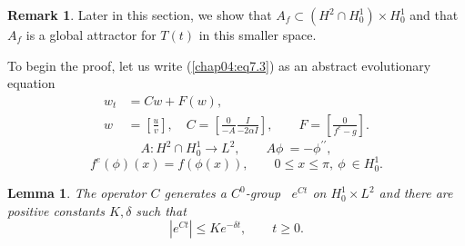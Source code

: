 \documentclass{surv-l}
\theoremstyle{plain}
\newtheorem{lemma}[theorem]{Lemma}
\theoremstyle{definition}
\newtheorem{remark}[theorem]{Remark}
\numberwithin{equation}{section}
\numberwithin{figure}{chapter}
\begin{document}
\begin{remark}\label{rem4.7.2} Later in this section, we show that $A_{f}\subset(H^{2}\cap H_{0}^{1})\times H_{0}^{1}$ and that $A_{f}$ is a global attractor for $T(t)$ in this smaller space.

To begin the proof, let us write (\ref{chap04:eq7.3}) as an abstract evolutionary equation
\begin{equation}\label{chap04:eq7.5}
\begin{split}
w_{t}&=Cw+F(w),\\
w&=\left[{\frac{u}{v}}\right],\quad C=\left[\!{\frac{0}{-A}}
{\frac{I}{-2\alpha I}}\!\right],\qquad
F=\left[\!{\frac{0}{f^{e}-g}}\!\right].
\end{split}
\end{equation}
\begin{equation}\label{chap04:eq7.6}
A:H^{2}\cap H_{0}^{1}\rightarrow L^{2},\qquad A\phi\ =-\phi^{\prime\prime},
\end{equation}
\begin{equation}\label{chap04:eq7.7}
f^{e}(\phi)(x)=f(\phi(x)), \qquad 0\leq x\leq\pi,\ \phi\ \in H_{0}^{1}.
\end{equation}
\end{remark}

\begin{lemma}\label{lem4.7.3} The operator $C$ generates a $C^{0}$-group \, $e^{Ct}$ on $H_{0}^{1}\times L^{2}$ and there are positive constants $K, \delta$ such that
\begin{equation}\label{chap04:eq7.8}
|e^{Ct}|\leq Ke^{-\delta t},\qquad t\geq 0.
\end{equation}
\end{lemma}
\end{document}
